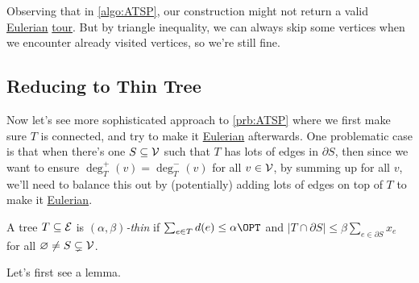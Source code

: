 \begin{remark}[Repetition]
	Observing that in \autoref{algo:ATSP}, our construction might not return a valid  \href{https://en.wikipedia.org/wiki/Eulerian_path}{Eulerian} \hyperref[def:tour]{tour}. But by triangle inequality, we can always skip some vertices when we encounter already visited vertices, so we're still fine.
\end{remark}

\subsection{Reducing to Thin Tree}
Now let's see more sophisticated approach to \autoref{prb:ATSP} where we first make sure \(T\) is connected, and try to make it  \href{https://en.wikipedia.org/wiki/Eulerian_path}{Eulerian} afterwards. One problematic case is that when there's one \(S \subseteq \mathcal{\MakeUppercase{v}} \) such that \(T\) has lots of edges in \(\partial S\), then since we want to ensure \(\deg^+_T(v) = \deg^-_T(v)\) for all \(v\in \mathcal{\MakeUppercase{v}} \), by summing up for all \(v\), we'll need to balance this out by (potentially) adding lots of edges on top of \(T\) to make it  \href{https://en.wikipedia.org/wiki/Eulerian_path}{Eulerian}.

\begin{definition}\label{def:thin}
	A tree \(T\subseteq \mathcal{\MakeUppercase{e}} \) is \emph{\((\alpha , \beta )\)-thin} if \(\sum_{e\in T} d(e) \leq \alpha \OPT\) and \(\left\vert T \cap \partial S \right\vert \leq \beta \sum_{e\in \partial S} x_e\) for all \(\varnothing \neq S \subsetneq \mathcal{\MakeUppercase{v}} \).
\end{definition}

Let's first see a lemma.

